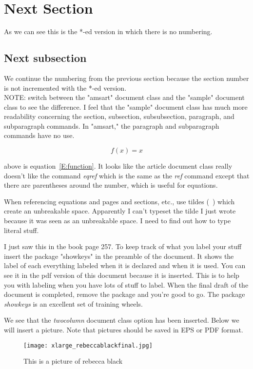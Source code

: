 \documentclass[twocolumn]{article} %
\begin{document}
\section*{Next Section}
As we can see this is the *-ed version in which there is no numbering. 
\subsection{Next subsection}
We continue the numbering from the previous section because the section number is not incremented with the *-ed version. \\
NOTE: switch between the "amsart" document class and the "sample" document class to see the difference. I feel that the "sample" document class has much more readability concerning the section, subsection, subsubsection, paragraph, and subparagraph commands. In "amsart," the paragraph and subparagraph commands have no use. 

\begin{equation} \label{E:function}
f(x) = x
\end{equation}

above is equation~\ref{E:function}. It looks like the article document class really doesn't like the command \emph{eqref} which is the same as the \emph{ref} command except that there are parentheses around the number, which is useful for equations. \par
When referencing equations and pages and sections, etc., use tildes (~) which create an unbreakable space. Apparently I can't typeset the tilde I just wrote because it was seen as an unbreakable space. I need to find out how to type literal stuff. \par
\bigskip
I just saw this in the book page 257. To keep track of what you label  your stuff insert the package "showkeys" in the preamble of the document. It shows the label of each everything labeled when it is declared and when it is used. You can see it in the pdf version of this document because it is inserted. This is to help you with labeling when you have lots of stuff to label. When the final draft of the document is completed, remove the package and you're good to go. The package \emph{showkeys} is an excellent set of training wheels. 

\bigskip
We see that the \emph{twocolumn} document class option has been inserted. Below we will insert a picture. Note that pictures should be saved in EPS or PDF format. 
\begin{figure}[ht]
   \texttt{[image: xlarge\_rebeccablackfinal.jpg]}
   \caption{This is a picture of rebecca black} \label{F:picture}
\end{figure}
\end{document}
